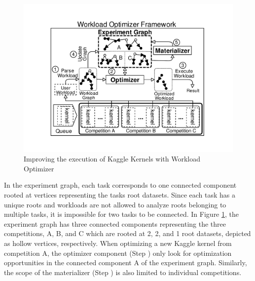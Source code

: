\begin{figure}
\centering
\includegraphics[width=\columnwidth]{../images/kaggle-workload-optimizer}
\caption{Improving the execution of Kaggle Kernels with Workload Optimizer}
\label{improved-use-case}
\end{figure}

In the experiment graph, each task corresponds to one connected component rooted at vertices representing the tasks root datasets.
Since each task has a unique roots and workloads are not allowed to analyze roots belonging to multiple tasks, it is impossible for two tasks to be connected.
In Figure \ref{improved-use-case}, the experiment graph has three connected components representing the three competitions, A, B, and C which are rooted at 2, 2, and 1 root datasets, depicted as hollow vertices, respectively.
When optimizing a new Kaggle kernel from competition A, the optimizer component (Step ) only look for optimization opportunities in the connected component A of the experiment graph.
Similarly, the scope of the materializer (Step ) is also limited to individual competitions.